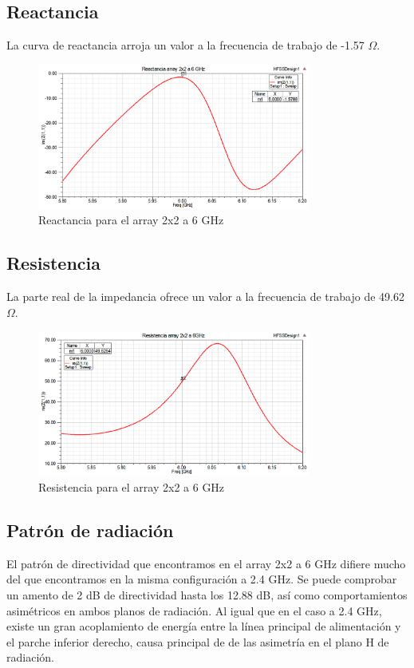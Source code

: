 \newpage
\subsection{Reactancia}
\par La curva de reactancia arroja un valor a la frecuencia de trabajo de -1.57 $\Omega$. 
\\
\begin{figure}[H]
    \centering
        \includegraphics[width=0.8\textwidth]{archivos/analisis/2x22/2}
        \caption{Reactancia para el array 2x2 a 6 GHz}
        \label{fig:react2x22}
\end{figure}

\subsection{Resistencia}
\par La parte real de la impedancia ofrece un valor a la frecuencia de trabajo de 49.62 $\Omega$.
\\
\begin{figure}[H]
    \centering
        \includegraphics[width=0.8\textwidth]{archivos/analisis/2x22/3}
        \caption{Resistencia para el array 2x2 a 6 GHz}
        \label{fig:resis2x22}
\end{figure}

\subsection{Patrón de radiación}
\par El patrón de directividad que encontramos en el array 2x2 a 6 GHz difiere mucho del que encontramos en la misma configuración a 2.4 GHz. Se puede comprobar un amento de 2 dB de directividad hasta los 12.88 dB, así como comportamientos asimétricos en ambos planos de radiación. Al igual que en el caso a 2.4 GHz, existe un gran acoplamiento de energía entre la línea principal de alimentación y el parche inferior derecho, causa principal de de las asimetría en el plano H de radiación.
\\
